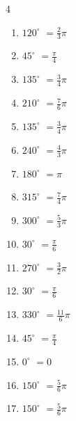 \begin{multicols}{4}
\begin{enumerate}
  \item $\displaystyle 120^{\circ}$
        $\displaystyle =\frac{2}{3}\pi$

  \item $\displaystyle 45^{\circ}$
        $\displaystyle =\frac{\pi}{4}$

  \item $\displaystyle 135^{\circ}$
        $\displaystyle =\frac{3}{4}\pi$

  \item $\displaystyle 210^{\circ}$
        $\displaystyle =\frac{7}{6}\pi$

  \item $\displaystyle 135^{\circ}$
        $\displaystyle =\frac{3}{4}\pi$

  \item $\displaystyle 240^{\circ}$
        $\displaystyle =\frac{4}{3}\pi$

  \item $\displaystyle 180^{\circ}$
        $\displaystyle =\pi$

  \item $\displaystyle 315^{\circ}$
        $\displaystyle =\frac{7}{4}\pi$

  \item $\displaystyle 300^{\circ}$
        $\displaystyle =\frac{5}{3}\pi$

\columnbreak %

\resetques

  \item $\displaystyle 30^{\circ}$
        $\displaystyle =\frac{\pi}{6}$

  \item $\displaystyle 270^{\circ}$
        $\displaystyle =\frac{3}{2}\pi$

  \item $\displaystyle 30^{\circ}$
        $\displaystyle =\frac{\pi}{6}$

  \item $\displaystyle 330^{\circ}$
        $\displaystyle =\frac{11}{6}\pi$

  \item $\displaystyle 45^{\circ}$
        $\displaystyle =\frac{\pi}{4}$

  \item $\displaystyle 0^{\circ}$
        $\displaystyle =0$

  \item $\displaystyle 150^{\circ}$
        $\displaystyle =\frac{5}{6}\pi$

  \item $\displaystyle 150^{\circ}$
        $\displaystyle =\frac{5}{6}\pi$


\end{enumerate}
\end{multicols}
